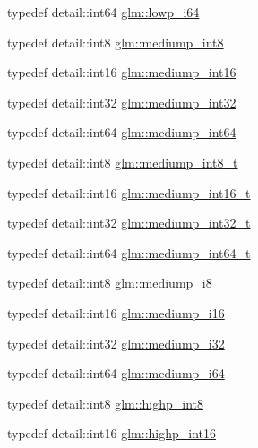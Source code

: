 \begin{DoxyCompactItemize}
\item 
typedef detail\+::int64 \hyperlink{group__gtc__type__precision_ga1f4ded25f71c0f3b4518936d50b54b6e}{glm\+::lowp\+\_\+i64}
\item 
typedef detail\+::int8 \hyperlink{group__gtc__type__precision_ga3ee8faab2278c44c5785af04b7b18a14}{glm\+::mediump\+\_\+int8}
\item 
typedef detail\+::int16 \hyperlink{group__gtc__type__precision_ga4611997edb6c61606daa11990cf08798}{glm\+::mediump\+\_\+int16}
\item 
typedef detail\+::int32 \hyperlink{group__gtc__type__precision_ga0660a752402702f420f13c686a7fff29}{glm\+::mediump\+\_\+int32}
\item 
typedef detail\+::int64 \hyperlink{group__gtc__type__precision_ga603c695fe5cd677d3f72a81343e19a74}{glm\+::mediump\+\_\+int64}
\item 
typedef detail\+::int8 \hyperlink{group__gtc__type__precision_ga626ac5f73d3538e62a879d6c56abfb36}{glm\+::mediump\+\_\+int8\+\_\+t}
\item 
typedef detail\+::int16 \hyperlink{group__gtc__type__precision_ga478fab608cf43040013d719a3e03b194}{glm\+::mediump\+\_\+int16\+\_\+t}
\item 
typedef detail\+::int32 \hyperlink{group__gtc__type__precision_gafd9b4bd9e4465aec63351b59100692c4}{glm\+::mediump\+\_\+int32\+\_\+t}
\item 
typedef detail\+::int64 \hyperlink{group__gtc__type__precision_ga555a2f85641550c232db473a9bb981f7}{glm\+::mediump\+\_\+int64\+\_\+t}
\item 
typedef detail\+::int8 \hyperlink{group__gtc__type__precision_ga28a8b5fd51072680bb55178c17cc7411}{glm\+::mediump\+\_\+i8}
\item 
typedef detail\+::int16 \hyperlink{group__gtc__type__precision_ga8454fc6a82c7bb787d0ac9663e08f63d}{glm\+::mediump\+\_\+i16}
\item 
typedef detail\+::int32 \hyperlink{group__gtc__type__precision_ga5e00ec824eb55968a6b6496f294d8c07}{glm\+::mediump\+\_\+i32}
\item 
typedef detail\+::int64 \hyperlink{group__gtc__type__precision_ga90fedf6c701ffbe00535156715e50787}{glm\+::mediump\+\_\+i64}
\item 
typedef detail\+::int8 \hyperlink{group__gtc__type__precision_ga57c86999e666760c304453f9bfdc09d1}{glm\+::highp\+\_\+int8}
\item 
typedef detail\+::int16 \hyperlink{group__gtc__type__precision_gaf0430ed80e88c0d1dfbe47f359659c81}{glm\+::highp\+\_\+int16}
\item 

\end{DoxyCompactItemize}
